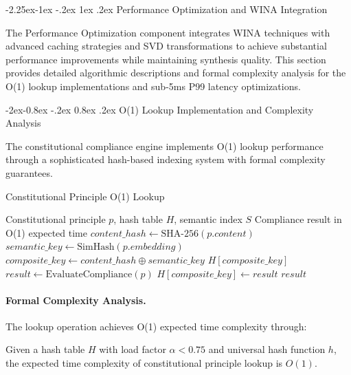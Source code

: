 \documentclass[manuscript,screen,9pt]{acmart}
\makeatletter
\renewcommand\subsection{\@startsection{subsection}{2}{\z@}%
  {-2.25ex\@plus -1ex \@minus -.2ex}%
  {1ex \@plus .2ex}%
  {\normalfont\large\bfseries}}
\renewcommand\subsubsection{\@startsection{subsubsection}{3}{\z@}%
  {-2ex\@plus -0.8ex \@minus -.2ex}%
  {0.8ex \@plus .2ex}%
  {\normalfont\normalsize\bfseries}}
\makeatother
\begin{document}
\subsection{Performance Optimization and WINA Integration}
\label{subsec:performance_optimization}

The Performance Optimization component integrates WINA techniques with advanced caching strategies and SVD transformations to achieve substantial performance improvements while maintaining synthesis quality. This section provides detailed algorithmic descriptions and formal complexity analysis for the O(1) lookup implementations and sub-5ms P99 latency optimizations.

\subsubsection{O(1) Lookup Implementation and Complexity Analysis}

The constitutional compliance engine implements O(1) lookup performance through a sophisticated hash-based indexing system with formal complexity guarantees.

\begin{algorithm}[H]
	\caption{Constitutional Principle O(1) Lookup}
	\label{alg:constitutional_lookup}
	\begin{algorithmic}[1]
		\Require Constitutional principle $p$, hash table $H$, semantic index $S$
		\Ensure Compliance result in O(1) expected time
		\State $content\_hash \leftarrow \text{SHA-256}(p.content)$
		\State $semantic\_key \leftarrow \text{SimHash}(p.embedding)$ 
		\State $composite\_key \leftarrow content\_hash \oplus semantic\_key$
		\State \Return $H[composite\_key]$
		\Else
		\State $result \leftarrow \text{EvaluateCompliance}(p)$
		\State $H[composite\_key] \leftarrow result$
		\State \Return $result$
		\EndIf
	\end{algorithmic}
\end{algorithm}

\paragraph{Formal Complexity Analysis.} The lookup operation achieves O(1) expected time complexity through:

\begin{theorem}
	Given a hash table $H$ with load factor $\alpha < 0.75$ and universal hash function $h$, the expected time complexity of constitutional principle lookup is $O(1)$.
\end{theorem}
\end{document}
